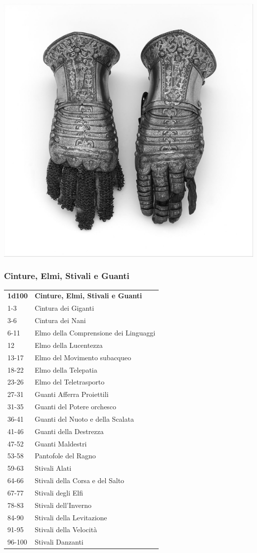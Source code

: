 \begin{multicols}{2}
	\begin{center}
		\includegraphics[width=0.8\linewidth]{immagini/gauntlet.png}\\
	\end{center}


	\subsubsection{Cinture, Elmi, Stivali e Guanti}

	\begin{tabularx}{0.45\textwidth}{lX}
		\textbf{1d100} & \textbf{Cinture, Elmi, Stivali e Guanti}\\
		1-3 &Cintura dei Giganti\\
		3-6 &Cintura dei Nani\\
		6-11 &Elmo della Comprensione dei Linguaggi\\
		12 &Elmo della Lucentezza\\
		13-17 &Elmo del Movimento subacqueo\\
		18-22 &Elmo della Telepatia\\
		23-26 &Elmo del Teletrasporto\\
		27-31 &Guanti Afferra Proiettili\\
		31-35 &Guanti del Potere orchesco\\
		36-41 &Guanti del Nuoto e della Scalata\\
		41-46 &Guanti della Destrezza\\
		47-52 &Guanti Maldestri\\
		53-58 &Pantofole del Ragno\\
		59-63 &Stivali Alati\\
		64-66 &Stivali della Corsa e del Salto\\
		67-77 &Stivali degli Elfi\\
		78-83 &Stivali dell'Inverno\\
		84-90 &Stivali della Levitazione\\
		91-95 &Stivali della Velocità\\
		96-100 &Stivali Danzanti\\
	\end{tabularx}


\end{multicols}
